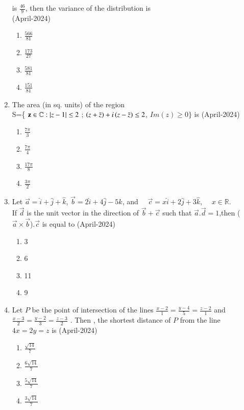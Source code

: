 \documentclass[journal,12pt,onecolumn]{IEEEtran}
\theoremstyle{remark}
\begin{document}
\begin{enumerate}
\begin{table}[h!]    
  \centering
 
\end{table}
is $\frac{46}{9}$, then the variance of the distribution is \\
\hfill{(April-2024)}
\begin{multicols}{2}
\begin{enumerate}
\item $\frac{566}{81}$
\item  $\frac{173}{27}$
\item $\frac{581}{81}$
\item $\frac{151}{81}$
\end{enumerate}
\end{multicols}
\item The area (in sq. units) of the region \\
S=\{ $\mathbf{z} \in \mathbb{C}:\left\vert z - 1\right\vert \leq 2$ ; $\left(z + \bar{z}\right) + i\left(z - \bar{z}\right) \leq 2$, $Im(z) \geq 0 \}$ is
\hfill{(April-2024)}
\begin{multicols}{2}
\begin{enumerate}
\item $\frac{7\pi}{3}$
\item $\frac{7\pi}{4}$
\item $\frac{17\pi}{8}$
\item $\frac{3\pi}{2}$
\end{enumerate}
\end{multicols}
\item Let $\vec{a} = \hat{i} + \hat{j} + \hat{k}$, $\vec{b} = 2\hat{i} + 4\hat{j} - 5\hat{k}$, and $\quad \vec{c} = x\hat{i} + 2\hat{j} + 3\hat{k}$, $\quad x \in \mathbb{R}$. \\
If $\vec{d}$  is the unit vector in the direction of  $\vec{b} + \vec{c}$ such that $ \vec{a}.\vec{d} = 1$,then ($\vec{a} \times \vec{b}$).$\vec{c}$ is equal to 
\hfill{(April-2024)}
\begin{multicols}{2}
\begin{enumerate}
\item 3
\item 6
\item 11
\item 9
\end{enumerate}
\end{multicols}

\item Let $P$ be the point of intersection of the lines $\frac{x-2}{1}=\frac{y-4}{5}=\frac{z-2}{1}$ and $\frac{x-3}{2}=\frac{y-2}{3}=\frac{z-3}{2}$ . Then , the shortest distance of $P$ from the line $4x=2y=z$ is
\hfill{(April-2024)}
\begin{enumerate}
\item $\frac{\sqrt{14}}{7}$
\item  $\frac{6\sqrt{14}}{7}$
\item $\frac{5\sqrt{14}}{7}$
\item $\frac{3\sqrt{14}}{7}$
\end{enumerate}


\end{enumerate}
\end{document}
